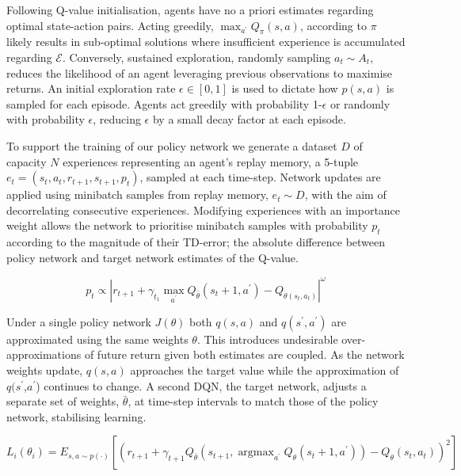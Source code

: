 \documentclass[runningheads]{llncs}
\DeclareMathOperator*{\argmax}{argmax}
\begin{document}
Following Q-value initialisation, agents have no a priori estimates regarding optimal state-action pairs. Acting greedily, $\max_{a^{\prime}} Q_\pi(s,a)$,  according to $\pi$ likely results in sub-optimal solutions where insufficient experience is accumulated regarding $\mathcal{E}$. Conversely, sustained exploration, randomly sampling $a_t \sim A_t$, reduces the likelihood of an agent leveraging previous observations to maximise returns. An initial exploration rate $\epsilon \in [0,1]$ is used to dictate how $p(s,a)$ is sampled for each episode. Agents act greedily with probability 1-$\epsilon$ or randomly with probability $\epsilon$, reducing $\epsilon$ by a small decay factor at each episode.


To support the training of our policy network we generate a dataset $D$ of capacity $N$ experiences representing an agent's replay memory, a 5-tuple \begin{math}
	e_{t} = (s_t,a_t,r_{t+1},s_{t+1}, p_t)
\end{math}, sampled at each time-step. Network updates are applied using minibatch samples from replay memory, $e_t \sim D$, with the aim of decorrelating consecutive experiences. Modifying experiences with an importance weight allows the network to prioritise minibatch samples with probability $p_t$ according to the magnitude of  their TD-error; the absolute difference between policy network and target network estimates of the Q-value.

\begin{equation}
	p_t \propto \left| r_{t+1} + \gamma_{t_1} \max_{a^\prime} Q_{\bar\theta}(s_t+1, a^\prime) - Q_{\theta(s_t, a_t)} \right|^\omega
\end{equation}

Under a single policy network $J(\theta)$ both $q(s,a)$ and $q(s^{\prime},a^{\prime})$ are approximated using the same weights $\theta$.  This introduces undesirable over-approximations of future return given both estimates are coupled. As the network weights update, $q(s,a)$ approaches the target value while the approximation of $q(s^{\prime}$,$a^{\prime}$) continues to change. A second DQN, the target network, adjusts a separate set of weights, $\bar{\theta}$, at time-step intervals to match those of the policy network, stabilising learning.

\begin{equation}
	L_i(\theta_i) = E_{s,a\sim p(\cdot)} \left[(r_{t+1} + \gamma_{t+1}Q_{\bar{\theta}}(s_{t+1}, \argmax_{a^\prime} Q_{\theta}(s_t+1, a^\prime)) - Q_{\theta}(s_t, a_t))^{2} \right] 
\end{equation}
\end{document}
